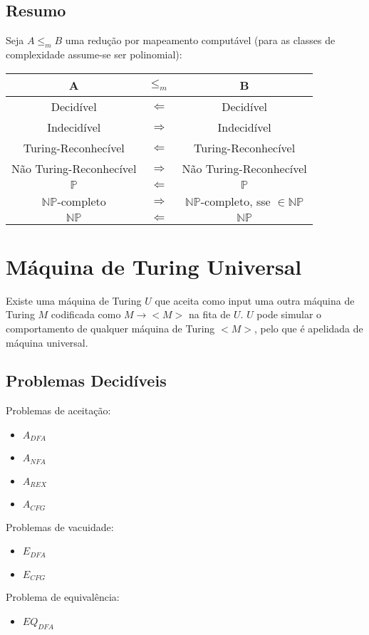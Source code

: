 \documentclass[10pt,a4paper]{report}
\begin{document}
\subsection{Resumo}
Seja $A \leq_m B$ uma redução por mapeamento computável (para as classes de complexidade assume-se ser polinomial): 
\begin{table}[H]
\centering
\begin{tabular}{|c|c|c|}
\hline
A                       & $\leq_m$ & B                       \\ \hline
Decidível               & $\Leftarrow$ & Decidível               \\ \hline
Indecidível             & $\Rightarrow$ & Indecidível             \\ \hline
Turing-Reconhecível     & $\Leftarrow$ & Turing-Reconhecível     \\ \hline
Não Turing-Reconhecível & $\Rightarrow$ & Não Turing-Reconhecível \\ \hline
$\mathbb{P}$            & $\Leftarrow$ & $\mathbb{P}$     \\ \hline
$\mathbb{NP}$-completo     & $\Rightarrow$ & $\mathbb{NP}$-completo, sse $\in \mathbb{NP}$     \\ \hline
$\mathbb{NP}$     & $\Leftarrow$ & $\mathbb{NP}$     \\ \hline
\end{tabular}
\end{table}
\section{Máquina de Turing Universal}
Existe uma máquina de Turing $U$ que aceita como input uma outra máquina de Turing $M$ codificada como $M \rightarrow <M>$ na fita de $U$. $U$ pode simular o comportamento de qualquer máquina de Turing $<M>$, pelo que é apelidada de máquina universal.
\subsection{Problemas Decidíveis}
Problemas de aceitação:
\begin{itemize}
\item $A_{DFA}$
\item $A_{NFA}$
\item $A_{REX}$
\item $A_{CFG}$
\end{itemize}
Problemas de vacuidade:
\begin{itemize}
\item $E_{DFA}$
\item $E_{CFG}$
\end{itemize}
Problema de equivalência:
\begin{itemize}
\item $EQ_{DFA}$
\end{itemize}
\end{document}
